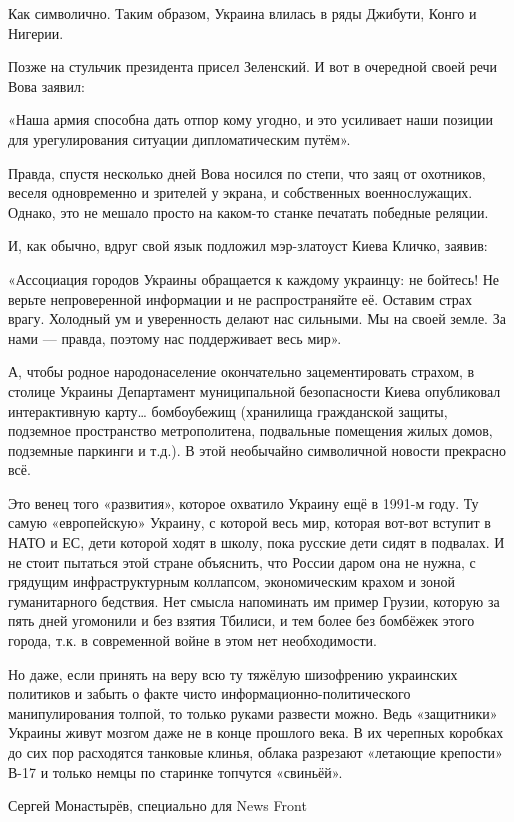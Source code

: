 Как символично. Таким образом, Украина влилась в ряды Джибути, Конго и Нигерии.

Позже на стульчик президента присел Зеленский. И вот в очередной своей речи Вова заявил:

«Наша армия способна дать отпор кому угодно, и это усиливает наши позиции для
урегулирования ситуации дипломатическим путём».

Правда, спустя несколько дней Вова носился по степи, что заяц от охотников,
веселя одновременно и зрителей у экрана, и собственных военнослужащих. Однако,
это не мешало просто на каком-то станке печатать победные реляции.

И, как обычно, вдруг свой язык подложил мэр-златоуст Киева Кличко, заявив:

«Ассоциация городов Украины обращается к каждому украинцу: не бойтесь! Не
верьте непроверенной информации и не распространяйте её. Оставим страх врагу.
Холодный ум и уверенность делают нас сильными. Мы на своей земле. За нами —
правда, поэтому нас поддерживает весь мир».

А, чтобы родное народонаселение окончательно зацементировать страхом, в столице
Украины Департамент муниципальной безопасности Киева опубликовал интерактивную
карту… бомбоубежищ (хранилища гражданской защиты, подземное пространство
метрополитена, подвальные помещения жилых домов, подземные паркинги и т.д.). В
этой необычайно символичной новости прекрасно всё.

Это венец того «развития», которое охватило Украину ещё в 1991-м году. Ту самую
«европейскую» Украину, с которой весь мир, которая вот-вот вступит в НАТО и ЕС,
дети которой ходят в школу, пока русские дети сидят в подвалах. И не стоит
пытаться этой стране объяснить, что России даром она не нужна, с грядущим
инфраструктурным коллапсом, экономическим крахом и зоной гуманитарного
бедствия. Нет смысла напоминать им пример Грузии, которую за пять дней
угомонили и без взятия Тбилиси, и тем более без бомбёжек этого города, т.к. в
современной войне в этом нет необходимости.

Но даже, если принять на веру всю ту тяжёлую шизофрению украинских политиков и
забыть о факте чисто информационно-политического манипулирования толпой, то
только руками развести можно. Ведь «защитники» Украины живут мозгом даже не в
конце прошлого века. В их черепных коробках до сих пор расходятся танковые
клинья, облака разрезают «летающие крепости» В-17 и только немцы по старинке
топчутся «свиньёй».

Сергей Монастырёв, специально для News Front
